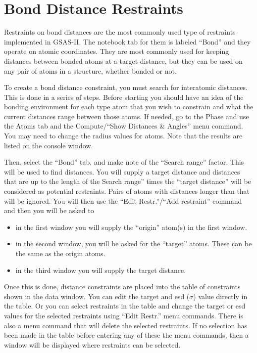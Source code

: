 \section{Bond Distance Restraints}
Restraints on bond distances are the most commonly used type of restraints implemented in GSAS-II. The notebook tab for them is labeled ``Bond'' and they operate on atomic coordinates. They are most commonly used for keeping distances between bonded atoms at a target distance, but they can be used on any pair of atoms in a structure, whether bonded or not. 

To create a bond distance constraint, you must search for interatomic distances. This is done in a series of steps. Before starting you should have an idea of the bonding environment for each type atom that you wish to constrain and what the current distances range between those atoms. If needed, go to the Phase and use the Atoms tab and the Compute/``Show Distances \& Angles'' menu command. You may need to change the radius values for atoms. Note that the results are listed on the console window. 

Then, select the ``Bond'' tab, and make note of the ``Search range'' factor. This will be used to find distances. You will supply a target distance and distances that are up to the length of the Search range'' times the ``target distance'' will be considered as potential restraints. Pairs of atoms with distances longer than that will be ignored. 
You will then use the  ``Edit Restr.''/``Add restraint'' command and then you will be asked to 
\begin{itemize}
    \item in the first window you will supply the ``origin'' atom(s) in the first window. 
    \item in the second window, you will be asked for the ``target'' atoms. These can be the same as the origin atoms. 
    \item in the third window you will supply the target distance.
\end{itemize}
Once this is done, distance constraints are placed into the table of constraints shown in the data window. You can edit the target and esd ($\sigma$) value directly in the table. Or you can select restraints in the table and change the target or esd values for the selected restraints using ``Edit Restr.'' menu commands. There is also a menu command that will delete the selected restraints. If no selection has been made in the table before entering any of these the menu commands, then a window will be displayed where restraints can be selected. 

